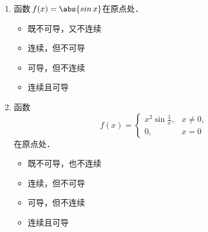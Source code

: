 \documentclass[a4paper,punct=CCT]{ctexbook}
\theoremstyle{definition}
\theoremstyle{remark}
\newif\ifshowsol
\begin{document}
\begin{enumerate}
  \ifshowsol
  函数\(f\)显然在此处左连续，所以有\(f'_-(1) = \paren[\big]{\frac23 x^3}'\big\vert_1 = 2x^2\big\vert_1 = 2\)．又因为\(f(1) = 2/3 \ne 1 = f_-(1)\)，函数\(f\)显然不是右连续的，因此也不是右可导的．
  \fi

\item 函数\(\,f(x) = \abs{\sin x}\)在原点处\uline{\hspace{8em}}．
  \begin{itemize}
    \renewcommand{\labelitemi}{\faCircleThin}
  \item 既不可导，又不连续
    \ifshowsol
  \item[\faCircle]
    \else
  \item
    \fi
    连续，但不可导
  \item 可导，但不连续
  \item 连续且可导
  \end{itemize}

  \ifshowsol
  因为\(f_-(0) = -\sin_-0 = 0 = \sin_+0 = f_+(0)\)且\(f(0) = 0\)，所以它在原点处连续．又因为~\(f'_-(0) = -\sin'_-0 = -1 \ne 1 = \sin'_+0 = f'_+(0)\)，所以它在原点处不可导．
  \fi

\item 函数
  \begin{equation*}
    f(x) =
    \begin{cases}
      x^2 \sin\frac1x, & x \ne 0, \\
      0, & x = 0
    \end{cases}
  \end{equation*}
  在原点处\uline{\hspace{8em}}．
  \begin{itemize}
    \renewcommand{\labelitemi}{\faCircleThin}
  \item 既不可导，也不连续
  \item 连续，但不可导
  \item 可导，但不连续
    \ifshowsol
  \item[\faCircle]
    \else
  \item
    \fi
    连续且可导
  \end{itemize}

  \ifshowsol
  根据定理~\ref{thm:deriv2cont}，可导则连续．又有
  \begin{equation*}
    f'(0)
    = \lim_{\fdx\to0} \frac{\fwdf\,f(0)}{\fdx}
    = \lim_{\fdx\to0} \frac{\,f(\fdx)}{\fdx}
    = \lim_{\fdx\to0} \frac{\fdx^2 \sin\frac1\fdx}{\fdx}
    = \lim_{\fdx\to0} \fdx \sin\frac1\fdx
    = 0.
  \end{equation*}
  \fi


\end{enumerate}
\end{document}
